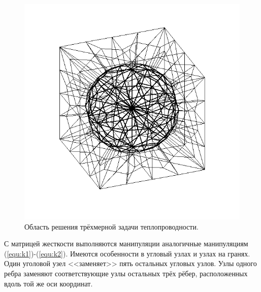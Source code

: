 \begin{figure} [ht] 
    \center
    \includegraphics [scale=0.8] {images/3d}
    \caption{Область решения трёхмерной задачи теплопроводности.} 
    \label{images:3d}  
\end{figure}

С матрицей жесткости выполняются манипуляции аналогичные манипуляциям (\ref{equ:k1})-(\ref{equ:k2}).
Имеются особенности в угловый узлах и узлах на гранях. 
Один уголовой узел <<заменяет>> пять остальных угловых узлов. 
Узлы одного ребра заменяют соответствующие узлы остальных трёх рёбер, расположенных вдоль той же оси координат.


